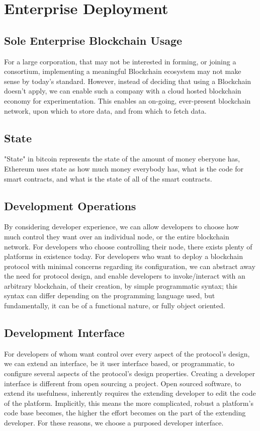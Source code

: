 \documentclass[12pt, titlepage, twocolumn]{report}
\begin{document}
\chapter{Enterprise Deployment}

\section{Sole Enterprise Blockchain Usage}
For a large corporation, that may not be interested in forming, or joining a consortium, implementing a meaningful Blockchain ecosystem may not make sense by today's standard. However, instead of deciding that using a Blockchain doesn't apply, we can enable such a company with a cloud hosted blockchain economy for experimentation. This enables an on-going, ever-present blockchain network, upon which to store data, and from which to fetch data. 

\section{State}
"State" in bitcoin represents the state of the amount of money eberyone has, Ethereum uses state as how much money everybody has, what is the code for smart contracts, and what is the state of all of the smart contracts.


\section{Development Operations}
By considering developer experience, we can allow developers to choose how much control they want over an individual node, or the entire blockchain network. For developers who choose controlling their node, there exists plenty of platforms in existence today. For developers who want to deploy a blockchain protocol with minimal concerns regarding its configuration, we can abstract away the need for protocol design, and enable developers to invoke/interact with an arbitrary blockchain, of their creation, by simple programmatic syntax; this syntax can differ depending on the programming language used, but fundamentally, it can be of a functional nature, or fully object oriented.

\section{Development Interface}
For developers of whom want control over every aspect of the protocol's design, we can extend an interface, be it user interface based, or programmatic, to configure several aspects of the protocol's design properties. Creating a developer interface is different from open sourcing a project. Open sourced software, to extend its usefulness, inherently requires the extending developer to edit the code of the platform. Implicitly, this means the more complicated, robust a platform's code base becomes, the higher the effort becomes on the part of the extending developer. For these reasons, we choose a purposed developer interface.
\end{document}
